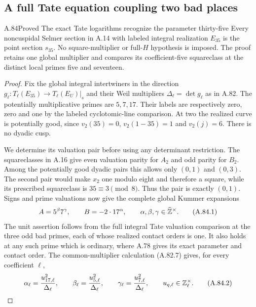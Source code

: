 \subsection{A full Tate equation coupling two bad places}

\begin{statement}{A.84}{Proved}
{The exact Tate logarithms recognize the parameter thirty-five}
Every noncuspidal Selmer section in A.14 with labeled integral
realization $E_{35}$ is the point section $s_{35}$.
No square-multiplier or full-$H$ hypothesis is imposed.
The proof retains one global multiplier and compares its
coefficient-five squareclass at the distinct local primes
five and seventeen.
\end{statement}
\begin{proof}
Fix the global integral intertwiners in the direction
$g_\ell:T_\ell(E_{35})\to T_\ell(E_U)|_s$ and their
Weil multipliers $\Delta_\ell=\det g_\ell$ as in A.82.
The potentially multiplicative primes are $5,7,17$.
Their labels are respectively zero, zero and one by the
labeled cyclotomic-line comparison.
At two the realized curve is potentially good, since
$v_2(35)=0$, $v_2(1-35)=1$ and $v_2(j)=6$.
There is no dyadic cusp.

We determine its valuation pair before using any
determinant restriction.  The squareclasses in A.16
give even valuation parity for $A_2$ and odd parity for
$B_2$.  Among the potentially good dyadic pairs this
allows only $(0,1)$ and $(0,3)$.
The second pair would make $x_2$ one modulo eight and
therefore a square, while its prescribed squareclass
is $35\equiv3\pmod8$.  Thus the pair is exactly
$(0,1)$.
Signs and prime valuations now give the complete global
Kummer expansions
\[
                    A=5^\beta7^\gamma,
                  \qquad B=-2\cdot17^\alpha,
       \qquad\alpha,\beta,\gamma\in\widehat{\mathbb Z}^\times.
\tag{A.84.1}
\]
The unit assertion follows from the full integral Tate
valuation comparison at the three odd bad primes,
each of whose realized contact orders is one.
It also holds at any such prime which is ordinary,
where A.78 gives its exact parameter and contact order.
The common-multiplier calculation (A.82.7) gives,
for every coefficient $\ell$,
\[
 \alpha_\ell=\frac{u_{17,\ell}^2}{\Delta_\ell},
 \qquad
 \beta_\ell=\frac{u_{5,\ell}^2}{\Delta_\ell},
 \qquad
 \gamma_\ell=\frac{u_{7,\ell}^2}{\Delta_\ell},
       \qquad u_{q,\ell}\in\mathbb Z_\ell^\times.
\tag{A.84.2}
\]


\end{proof}

